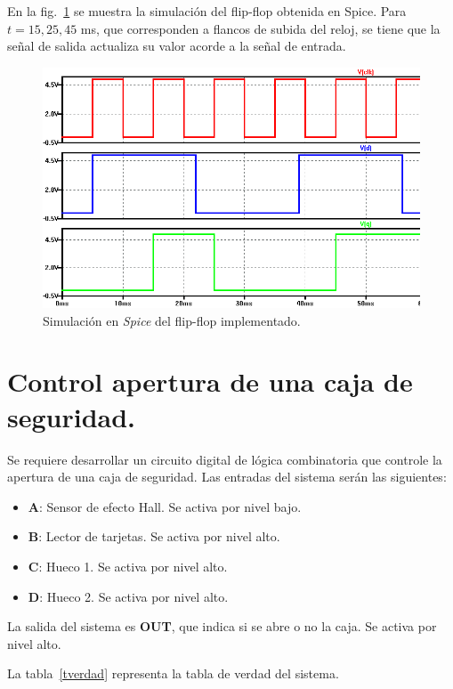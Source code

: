 \documentclass[twocolumn]{IEEEtran}
\begin{document}
\noindent
En la fig.~\ref{ffsim} se muestra la simulación del flip-flop obtenida en Spice. Para $t=15,25,45$ ms, que corresponden a flancos de subida del reloj, se tiene que la señal de salida actualiza su valor acorde a la señal de entrada.
\begin{figure}[H]
  \centering
    \includegraphics[scale=0.3]{./pics/sim_ff2.png}
      \caption{Simulación en \textit{Spice} del flip-flop implementado.}
	\label{ffsim}
\end{figure}

\section{Control apertura de una caja de seguridad.}
\noindent
Se requiere desarrollar un circuito digital de lógica combinatoria que controle la apertura de una caja de seguridad. Las entradas del sistema serán las siguientes:

\begin{itemize}
	\item \textbf{A}: Sensor de efecto Hall. Se activa por nivel bajo.
	\item \textbf{B}: Lector de tarjetas. Se activa por nivel alto.
	\item \textbf{C}: Hueco 1. Se activa por nivel alto.
	\item \textbf{D}: Hueco 2. Se activa por nivel alto.
\end{itemize}

La salida del sistema es \textbf{OUT}, que indica si se abre o no la caja. Se activa por nivel alto.

La tabla~\ref{tverdad} representa la tabla de verdad del sistema.
\end{document}

